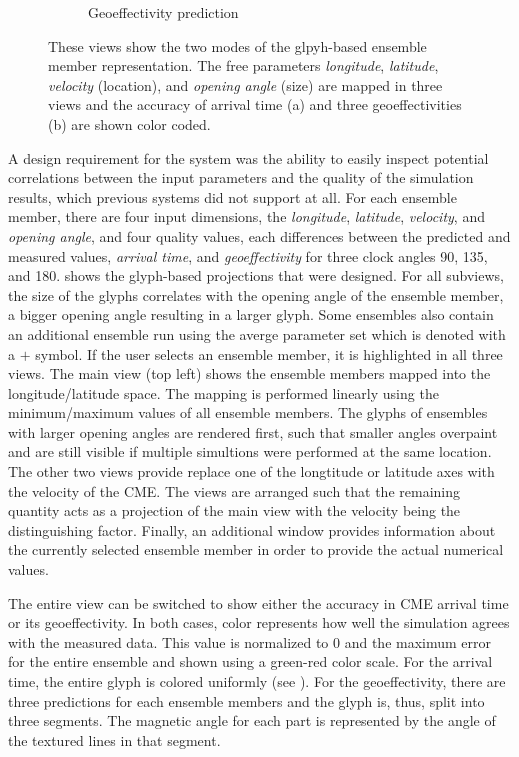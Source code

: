 \begin{figure}
\begin{subfigure}[b]{0.32\textwidth}
    \caption{Geoeffectivity prediction}
    \label{contributions:astro:spaceweather:ensemble:kp}
\end{subfigure}
\caption{These views show the two modes of the glpyh-based ensemble member representation.  The free parameters \emph{longitude}, \emph{latitude}, \emph{velocity} (location), and \emph{opening angle} (size) are mapped in three views and the accuracy of arrival time (a) and three geoeffectivities (b) are shown color coded.}
\label{contributions:astro:spaceweather:ensemble}
\end{figure}

A design requirement for the system was the ability to easily inspect potential correlations between the input parameters and the quality of the simulation results, which previous systems did not support at all.  For each ensemble member, there are four input dimensions, the \emph{longitude}, \emph{latitude}, \emph{velocity}, and \emph{opening angle}, and four quality values, each differences between the predicted and measured values, \emph{arrival time}, and \emph{geoeffectivity} for three clock angles 90\textdegree , 135\textdegree , and 180\textdegree .   shows the  glyph-based projections that were designed.  For all subviews, the size of the glyphs correlates with the opening angle of the ensemble member, a bigger opening angle resulting in a larger glyph.  Some ensembles also contain an additional ensemble run using the averge parameter set which is denoted with a $+$ symbol.  If the user selects an ensemble member, it is highlighted in all three views.  The main view (top left) shows the ensemble members mapped into the longitude/latitude space.  The mapping is performed linearly using the minimum/maximum values of all ensemble members.  The glyphs of ensembles with larger opening angles are rendered first, such that smaller angles overpaint and are still visible if multiple simultions were performed at the same location.  The other two views provide replace one of the longtitude or latitude axes with the velocity of the CME.  The views are arranged such that the remaining quantity acts as a projection of the main view with the velocity being the distinguishing factor.  Finally, an additional window provides information about the currently selected ensemble member in order to provide the actual numerical values.

The entire view can be switched to show either the accuracy in CME arrival time or its geoeffectivity.  In both cases, color represents how well the simulation agrees with the measured data.  This value is normalized to $0$ and the maximum error for the entire ensemble and shown using a green-red color scale.  For the arrival time, the entire glyph is colored uniformly (see ).  For the geoeffectivity, there are three predictions for each ensemble members and the glyph is, thus, split into three segments.  The magnetic angle for each part is represented by the angle of the textured lines in that segment.

